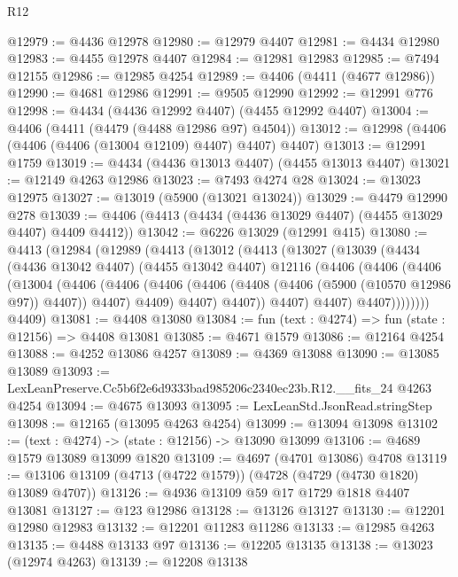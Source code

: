 \begin{lexlean}{R12}
\begin{coremodule}
@12979 := @4436 @12978
@12980 := @12979 @4407
@12981 := @4434 @12980
@12983 := @4455 @12978 @4407
@12984 := @12981 @12983
@12985 := @7494 @12155
@12986 := @12985 @4254
@12989 := @4406 (@4411 (@4677 @12986))
@12990 := @4681 @12986
@12991 := @9505 @12990
@12992 := @12991 @776
@12998 := @4434 (@4436 @12992 @4407) (@4455 @12992 @4407)
@13004 := @4406 (@4411 (@4479 (@4488 @12986 @97) @4504))
@13012 := @12998 (@4406 (@4406 (@4406 (@13004 @12109) @4407) @4407) @4407)
@13013 := @12991 @1759
@13019 := @4434 (@4436 @13013 @4407) (@4455 @13013 @4407)
@13021 := @12149 @4263 @12986
@13023 := @7493 @4274 @28
@13024 := @13023 @12975
@13027 := @13019 (@5900 (@13021 @13024))
@13029 := @4479 @12990 @278
@13039 := @4406 (@4413 (@4434 (@4436 @13029 @4407) (@4455 @13029 @4407) @4409 @4412))
@13042 := @6226 @13029 (@12991 @415)
@13080 := @4413
    (@12984
      (@12989
        (@4413
          (@13012
            (@4413
              (@13027
                (@13039
                  (@4434
                    (@4436 @13042 @4407)
                    (@4455 @13042 @4407)
                    @12116
                    (@4406
                      (@4406
                        (@4406
                          (@13004
                            (@4406
                              (@4406
                                (@4406
                                  (@4406 (@4408 (@4406 (@5900 (@10570 @12986 @97)) @4407)) @4407)
                                  @4409)
                                @4407)
                              @4407))
                          @4407)
                        @4407)
                      @4407))))))))
      @4409)
@13081 := @4408 @13080
@13084 := fun (text : @4274) => fun (state : @12156) => @4408 @13081
@13085 := @4671 @1579
@13086 := @12164 @4254
@13088 := @4252 @13086 @4257
@13089 := @4369 @13088
@13090 := @13085 @13089
@13093 := LexLeanPreserve.Cc5b6f2e6d9333bad985206c2340ec23b.R12.__fits_24 @4263 @4254
@13094 := @4675 @13093
@13095 := LexLeanStd.JsonRead.stringStep
@13098 := @12165 (@13095 @4263 @4254)
@13099 := @13094 @13098
@13102 := (text : @4274) -> (state : @12156) -> @13090 @13099
@13106 := @4689 @1579 @13089 @13099 @1820
@13109 := @4697 (@4701 @13086) @4708
@13119 := @13106 @13109 (@4713 (@4722 @1579)) (@4728 (@4729 (@4730 @1820) @13089 @4707))
@13126 := @4936 @13109 @59 @17 @1729 @1818 @4407 @13081
@13127 := @123 @12986
@13128 := @13126 @13127
@13130 := @12201 @12980 @12983
@13132 := @12201 @11283 @11286
@13133 := @12985 @4263
@13135 := @4488 @13133 @97
@13136 := @12205 @13135
@13138 := @13023 (@12974 @4263)
@13139 := @12208 @13138

\end{coremodule}
\end{lexlean}
